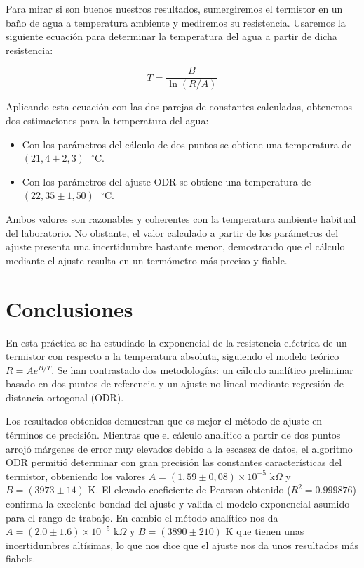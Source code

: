 \documentclass[11pt,a4paper]{article}
\begin{document}
\begin{itemize}
Para mirar si son buenos nuestros resultados, sumergiremos el termistor en un baño de agua a temperatura ambiente y mediremos su resistencia. Usaremos la siguiente ecuación para determinar la temperatura del agua a partir de dicha resistencia:

\begin{equation}
T = \frac{B}{\ln(R/A)}
\end{equation}

Aplicando esta ecuación con las dos parejas de constantes calculadas, obtenemos dos estimaciones para la temperatura del agua:
\begin{itemize}
    \item Con los parámetros del cálculo de dos puntos se obtiene una temperatura de $(21,4 \pm 2,3) \text{ }^{\circ}\text{C}$.
    \item Con los parámetros del ajuste ODR se obtiene una temperatura de $(22,35 \pm 1,50) \text{ }^{\circ}\text{C}$.
\end{itemize}

Ambos valores son razonables y coherentes con la temperatura ambiente habitual del laboratorio. No obstante, el valor calculado a partir de los parámetros del ajuste presenta una incertidumbre bastante menor, demostrando que el cálculo mediante el ajuste resulta en un termómetro más preciso y fiable.

\section{Conclusiones}
En esta práctica se ha estudiado la exponencial de la resistencia eléctrica de un termistor con respecto a la temperatura absoluta, siguiendo el modelo teórico $R=Ae^{B/T}$. Se han contrastado dos metodologías: un cálculo analítico preliminar basado en dos puntos de referencia y un ajuste no lineal mediante regresión de distancia ortogonal (ODR).

Los resultados obtenidos demuestran que es mejor el método de ajuste en términos de precisión. Mientras que el cálculo analítico a partir de dos puntos arrojó márgenes de error muy elevados debido a la escasez de datos, el algoritmo ODR permitió determinar con gran precisión las constantes características del termistor, obteniendo los valores $A=(1,59\pm0,08)\times10^{-5}\text{ k}\Omega$ y $B=(3973\pm14)\text{ K}$. El elevado coeficiente de Pearson obtenido ($R^2=0.999876$) confirma la excelente bondad del ajuste y valida el modelo exponencial asumido para el rango de trabajo. En cambio el método analítico nos da $A=(2.0\pm1.6)\times10^{-5}\text{ k}\Omega$ y $B=(3890\pm210)\text{ K}$ que tienen unas incertidumbres altísimas, lo que nos dice que el ajuste nos da unos resultados más fiabels.


\end{itemize}
\end{document}
